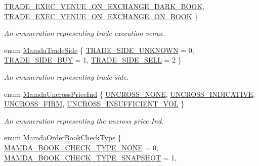 \begin{CompactItemize}
\hyperlink{namespaceWombat_daf4c098665070a9e45bf835bad3548ac902e6e69c109e72f2330f5a58b6bba5}{TRADE\_\-EXEC\_\-VENUE\_\-ON\_\-EXCHANGE\_\-DARK\_\-BOOK}, 
\hyperlink{namespaceWombat_daf4c098665070a9e45bf835bad3548a10ce5f31521c981beb41bba908b30469}{TRADE\_\-EXEC\_\-VENUE\_\-ON\_\-EXCHANGE\_\-ON\_\-BOOK}
 \}
\begin{CompactList}\small\item\em An enumeration representing trade execution venue. \item\end{CompactList}\item 
enum \hyperlink{namespaceWombat_e22aa41efabe0fe38b2d72577790ad3e}{Mamda\-Trade\-Side} \{ \hyperlink{namespaceWombat_e22aa41efabe0fe38b2d72577790ad3e46bd6ab942b0694d90a224a127ad28ea}{TRADE\_\-SIDE\_\-UNKNOWN} =  0, 
\hyperlink{namespaceWombat_e22aa41efabe0fe38b2d72577790ad3eca903e8301061e7177251d3b19559a0b}{TRADE\_\-SIDE\_\-BUY} =  1, 
\hyperlink{namespaceWombat_e22aa41efabe0fe38b2d72577790ad3e189f9ce71cfee2dca22b8978fb7825ac}{TRADE\_\-SIDE\_\-SELL} =  2
 \}
\begin{CompactList}\small\item\em An enumeration representing trade side. \item\end{CompactList}\item 
enum \hyperlink{namespaceWombat_4f0ec767cbe150ee160f65e719e76226}{Mamda\-Uncross\-Price\-Ind} \{ \hyperlink{namespaceWombat_4f0ec767cbe150ee160f65e719e762266e92ea2a67c0430651b1ec24d308053e}{UNCROSS\_\-NONE}, 
\hyperlink{namespaceWombat_4f0ec767cbe150ee160f65e719e7622667adfc8bc0927fb3c8d0b924163ab915}{UNCROSS\_\-INDICATIVE}, 
\hyperlink{namespaceWombat_4f0ec767cbe150ee160f65e719e7622629524b84fe95ede2b5a4caa9c6f051a1}{UNCROSS\_\-FIRM}, 
\hyperlink{namespaceWombat_4f0ec767cbe150ee160f65e719e76226ed0dcfe64189c1f85ff4dff4577abeae}{UNCROSS\_\-INSUFFICIENT\_\-VOL}
 \}
\begin{CompactList}\small\item\em An enumeration representing the uncross price Ind. \item\end{CompactList}\item 
enum \hyperlink{namespaceWombat_6f15e7af875f3469c5fb0afe58b21667}{Mamda\-Order\-Book\-Check\-Type} \{ \hyperlink{namespaceWombat_6f15e7af875f3469c5fb0afe58b216673fc50d205a5508bfe67ffe574c87f62d}{MAMDA\_\-BOOK\_\-CHECK\_\-TYPE\_\-NONE} =  0, 
\hyperlink{namespaceWombat_6f15e7af875f3469c5fb0afe58b2166764215a6c819ecc747a441ca5de565169}{MAMDA\_\-BOOK\_\-CHECK\_\-TYPE\_\-SNAPSHOT} =  1, 

\end{CompactItemize}

